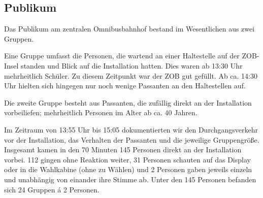 \subsection{Publikum}\label{publikum}

Das Publikum am zentralen Omnibusbahnhof bestand im Wesentlichen aus zwei Gruppen.

Eine Gruppe umfasst die Personen, die wartend an einer Haltestelle auf der ZOB-Insel standen und Blick auf die Installation hatten. Dies waren ab 13:30 Uhr mehrheitlich Schüler.
Zu diesem Zeitpunkt war der ZOB gut gefüllt.
Ab ca. 14:30 Uhr hielten sich hingegen nur noch wenige Passanten an den Haltestellen auf.

Die zweite Gruppe besteht aus Passanten, die zufällig direkt an der Installation vorbeiliefen; mehrheitlich Personen im Alter ab ca. 40 Jahren.

Im Zeitraum von 13:55 Uhr bis 15:05 dokumentierten wir den Durchgangsverkehr vor der Installation, das Verhalten der Passanten und die jeweilige Gruppengröße.
Insgesamt kamen in den 70 Minuten 145 Personen direkt an der Installation vorbei.
112 gingen ohne Reaktion weiter, 31 Personen schauten auf das Display oder in die Wahlkabine (ohne zu Wählen) und 2 Personen gaben jeweils einzeln und unabhängig von einander ihre Stimme ab.
Unter den 145 Personen befanden sich 24 Gruppen á 2 Personen.



